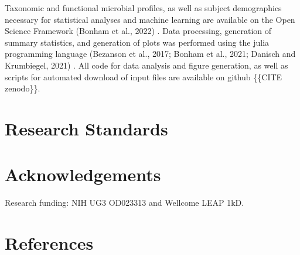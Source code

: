 \documentclass{article}
\begin{document}
Taxonomic and functional microbial profiles, as well as subject
demographics necessary for statistical analyses and machine learning are
available on the Open Science Framework
(Bonham et al.,
2022)
\cite{}.
 Data processing, generation of summary statistics, and
generation of plots was performed using the julia programming language
(Bezanson et al.,
2017; Bonham et al., 2021; Danisch and Krumbiegel, 2021)
\cite{}.
 All code for
data analysis and figure generation, as well as scripts for automated
download of input files are available on github \{\{CITE zenodo\}\}.

\section*{Research Standards}

\section*{Acknowledgements}

Research funding: NIH UG3 OD023313 and Wellcome LEAP 1kD.

\section*{References}

\printbibliography
\end{document}
